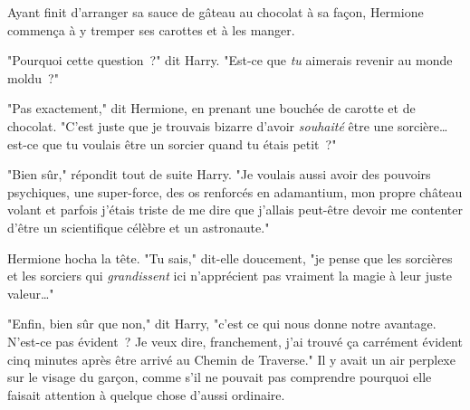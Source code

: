 Ayant finit d'arranger sa sauce de gâteau au chocolat à sa façon, Hermione commença à y tremper ses carottes et à les manger.

"Pourquoi cette question~?" dit Harry. "Est-ce que \emph{tu} aimerais revenir au monde moldu~?"

"Pas exactement," dit Hermione, en prenant une bouchée de carotte et de chocolat. "C'est juste que je trouvais bizarre d'avoir \emph{souhaité} être une sorcière… est-ce que tu voulais être un sorcier quand tu étais petit~?"

"Bien sûr," répondit tout de suite Harry. "Je voulais aussi avoir des pouvoirs psychiques, une super-force, des os renforcés en adamantium, mon propre château volant et parfois j'étais triste de me dire que j'allais peut-être devoir me contenter d'être un scientifique célèbre et un astronaute."

Hermione hocha la tête. "Tu sais," dit-elle doucement, "je pense que les sorcières et les sorciers qui \emph{grandissent} ici n'apprécient pas vraiment la magie à leur juste valeur…"

"Enfin, bien sûr que non," dit Harry, "c'est ce qui nous donne notre avantage. N'est-ce pas évident~? Je veux dire, franchement, j'ai trouvé ça carrément évident cinq minutes après être arrivé au Chemin de Traverse." Il y avait un air perplexe sur le visage du garçon, comme s'il ne pouvait pas comprendre pourquoi elle faisait attention à quelque chose d'aussi ordinaire. 

